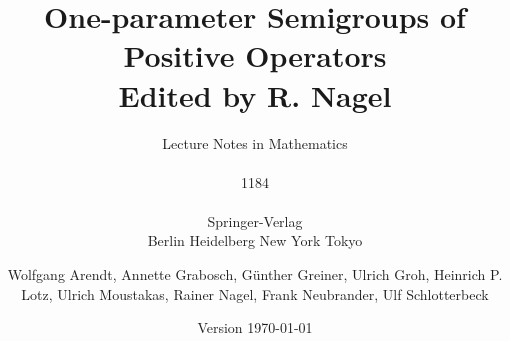 \documentclass[%
,DIV=12
	]{scrbook}%
\date{\LARGE Version \today}
\begin{document}
\author{Wolfgang Arendt, Annette Grabosch, Günther Greiner, Ulrich Groh, Heinrich P. Lotz, Ulrich Moustakas, Rainer Nagel, Frank Neubrander, Ulf Schlotterbeck}
\title{One-parameter Semigroups of Positive Operators\\
		{\large{Edited by R. Nagel}}}
\subtitle{Lecture Notes in Mathematics\\ \\ 1184\\ \\Springer-Verlag\\ Berlin Heidelberg New York Tokyo}
\maketitle
\frontmatter%

%

%
\tableofcontents
% 
%
\mainmatter%
%

 




% 






%






%






%

%
%
%
%
%
%
%



\backmatter%

\RaggedRight
%
% 
\printbibliography

%

%

\cleardoublepage 
\printindex





\end{document}
